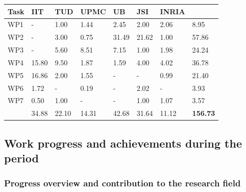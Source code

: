 \documentclass[12pt,a4paper,twoside]{article}
\begin{document}
\begin{longtable}{|C{1.5cm}|C{1.5cm}|C{1.5cm}|C{1.5cm}|C{1.5cm}|C{1.5cm}|C{1.5cm}|C{1.5cm}|}
\footnotesize \textbf{Task}& \footnotesize \textbf{IIT}&\footnotesize \textbf{TUD}&\footnotesize \textbf{UPMC}& \footnotesize \textbf{UB} &\footnotesize \textbf{JSI} &\footnotesize \textbf{INRIA} &  \\ \hline
\footnotesize WP1      &  -     &  1.00 &  1.44 &  2.45  &  2.00  &  2.06 & 8.95  \\  \hline
\footnotesize WP2      &  -     &  3.00 &  0.75 &  31.49 &  21.62 &  1.00 & 57.86 \\  \hline
\footnotesize WP3      &  -     &  5.60 &  8.51 &  7.15  &  1.00  &  1.98 & 24.24 \\   \hline
\footnotesize WP4      &  15.80 &  9.50 &  1.87 &  1.59  &  4.00  &  4.02 & 36.78 \\   \hline
\footnotesize WP5      &  16.86 &  2.00 &  1.55 &  -     &  -     &  0.99 & 21.40 \\  \hline
\footnotesize WP6      &  1.72  &  -    &  0.19 &  -     &  2.02  &  -    & 3.93  \\  \hline
\footnotesize WP7      &  0.50  &  1.00 &  -    &  -     &  1.00  &  1.07 & 3.57  \\  \hline
{}  &  34.88 &	22.10	& 14.31	& 42.68	 &  31.64	& 11.12 &  \textbf{156.73}     \\  
\end{longtable}











\subsection{Work progress and achievements during the period}

\subsubsection{Progress overview and contribution to the research field}
\end{document}
